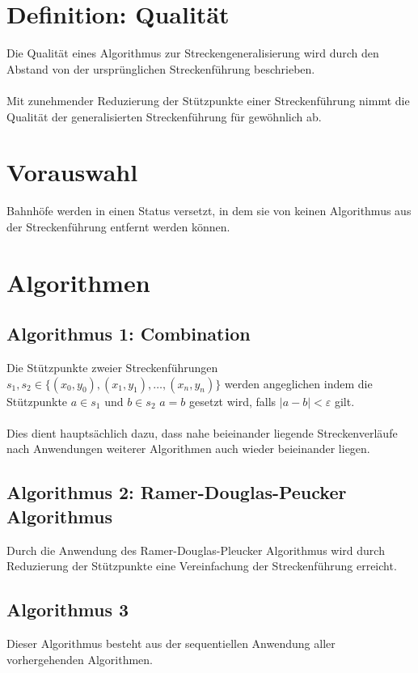 \documentclass[twoside]{scrartcl}
\begin{document}
\section{Definition: Qualität}
Die Qualität eines Algorithmus zur Streckengeneralisierung
wird durch den Abstand von der ursprünglichen Streckenführung
beschrieben.\\\\
Mit zunehmender Reduzierung der Stützpunkte einer Streckenführung
nimmt die Qualität der generalisierten Streckenführung für
gewöhnlich ab.
\section{Vorauswahl}
Bahnhöfe werden in einen Status versetzt, in dem sie von keinen
Algorithmus aus der Streckenführung entfernt werden können.
\section{Algorithmen}
\subsection{Algorithmus 1: Combination}
Die Stützpunkte zweier Streckenführungen
$s_1, s_2 \in \{(x_0, y_0), (x_1, y_1), \ldots, (x_n, y_n)\}$
werden angeglichen indem die Stützpunkte
$a \in s_1$ und  $b \in s_2$ $a = b$ gesetzt wird, falls
$|a - b| < \varepsilon$ gilt.\\
\\
Dies dient hauptsächlich dazu, dass nahe beieinander liegende
Streckenverläufe nach Anwendungen weiterer Algorithmen auch
wieder beieinander liegen.
\subsection{Algorithmus 2: Ramer-Douglas-Peucker Algorithmus}
Durch die Anwendung des Ramer-Douglas-Pleucker Algorithmus
wird durch Reduzierung der Stützpunkte eine Vereinfachung
der Streckenführung erreicht.

\subsection{Algorithmus 3}
Dieser Algorithmus besteht aus der sequentiellen Anwendung aller
vorhergehenden Algorithmen.
\end{document}
